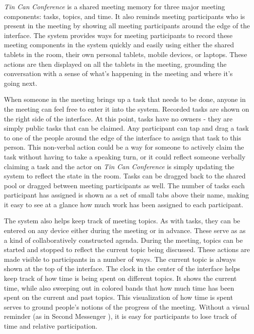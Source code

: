 \documentclass{tufte-handout}
\begin{document}
\emph{Tin Can Conference} is a shared meeting memory for three major meeting components: tasks, topics, and time. It also reminds meeting participants who is present in the meeting by showing all meeting participants around the edge of the interface. The system provides ways for meeting participants to record these meeting components in the system quickly and easily using either the shared tablets in the room, their own personal tablets, mobile devices, or laptops. These actions are then displayed on all the tablets in the meeting, grounding the conversation with a sense of what's happening in the meeting and where it's going next.

When someone in the meeting brings up a task that needs to be done, anyone in the meeting can feel free to enter it into the system. Recorded tasks are shown on the right side of the interface. At this point, tasks have no owners - they are simply public tasks that can be claimed. Any participant can tap and drag a task to one of the people around the edge of the interface to assign that task to this person. This non-verbal action could be a way for someone to actively claim the task without having to take a speaking turn, or it could reflect someone verbally claiming a task and the actor on \emph{Tin Can Conference} is simply updating the system to reflect the state in the room. Tasks can be dragged back to the shared pool or dragged between meeting participants as well. The number of tasks each participant has assigned is shown as a set of small tabs above their name, making it easy to see at a glance how much work has been assigned to each participant.

The system also helps keep track of meeting topics. As with tasks, they can be entered on any device either during the meeting or in advance. These serve as as a kind of collaboratively constructed agenda. During the meeting, topics can be started and stopped to reflect the current topic being discussed. These actions are made visible to participants in a number of ways. The current topic is always shown at the top of the interface. The clock in the center of the interface helps keep track of how time is being spent on different topics. It shows the current time, while also sweeping out in colored bands that how much time has been spent on the current and past topics. This visualization of how time is spent serves to ground people's notions of the progress of the meeting. Without a visual reminder (as in Second Messenger \citep{DiMicco:2007ie}), it is easy for participants to lose track of time and relative participation.
\end{document}

